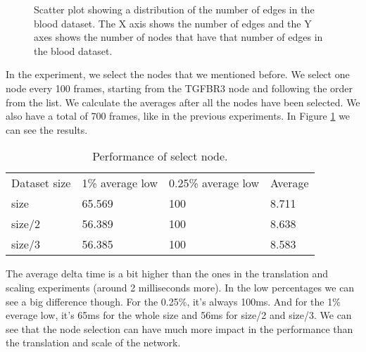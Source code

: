 \begin{figure}[h!]
  \centering
  \begin{minipage}{.8\textwidth}
  \end{minipage}
\caption{Scatter plot showing a distribution of the number of edges in the blood dataset. The X axis shows the number of edges and the Y axes shows the number of nodes that have that number of edges in the blood dataset.}
\label{fig:edges_nodes_blood}
\end{figure}

In the experiment, we select the nodes that we mentioned before. We select one node every 100 frames, starting from the TGFBR3 node and following the order from the list. We calculate the averages after all the nodes have been selected. We also have a total of 700 frames, like in the previous experiments. In Figure \ref{tab:experiment_select} we can see the results.

\begin{table}[h!]
\centering
\begin{tabular}{llll}
Dataset size & 1\% average low & 0.25\% average low & Average \\
size & 65.569 & 100 & 8.711 \\
size/2 & 56.389 & 100 & 8.638 \\
size/3 & 56.385 & 100 & 8.583 \\
\end{tabular}
\caption{Performance of select node.}
\label{tab:experiment_select}
\end{table}

The average delta time is a bit higher than the ones in the translation and scaling experiments (around 2 milliseconds more). In the low percentages we can see a big difference though. For the 0.25\%, it's always 100ms. And for the 1\% everage low, it's 65ms for the whole size and 56ms for size/2 and size/3. We can see that the node selection can have much more impact in the performance than the translation and scale of the network.

